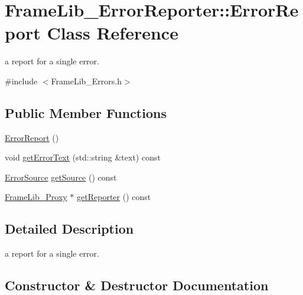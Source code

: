 \hypertarget{class_frame_lib___error_reporter_1_1_error_report}{}\section{Frame\+Lib\+\_\+\+Error\+Reporter\+:\+:Error\+Report Class Reference}
\label{class_frame_lib___error_reporter_1_1_error_report}


a report for a single error.  




{\ttfamily \#include $<$Frame\+Lib\+\_\+\+Errors.\+h$>$}

\subsection*{Public Member Functions}
\begin{DoxyCompactItemize}
\item 
\hyperlink{class_frame_lib___error_reporter_1_1_error_report_a34fe616ae6fb96cc1ed5c86a10278d96}{Error\+Report} ()
\item 
void \hyperlink{class_frame_lib___error_reporter_1_1_error_report_a84d41ecfcc46b4c19a086b2feb710578}{get\+Error\+Text} (std\+::string \&text) const
\item 
\hyperlink{_frame_lib___errors_8h_acdeab3b10c3aca41a844aa51b90b6f39}{Error\+Source} \hyperlink{class_frame_lib___error_reporter_1_1_error_report_a882c38b72acccf483ece5efc6790d98a}{get\+Source} () const
\item 
\hyperlink{struct_frame_lib___proxy}{Frame\+Lib\+\_\+\+Proxy} $\ast$ \hyperlink{class_frame_lib___error_reporter_1_1_error_report_a50f7b7856ac0a5c6d1e814c4d697a6c1}{get\+Reporter} () const
\end{DoxyCompactItemize}


\subsection{Detailed Description}
a report for a single error. 

\subsection{Constructor \& Destructor Documentation}
\mbox{\label{class_frame_lib___error_reporter_1_1_error_report_a34fe616ae6fb96cc1ed5c86a10278d96}} 
